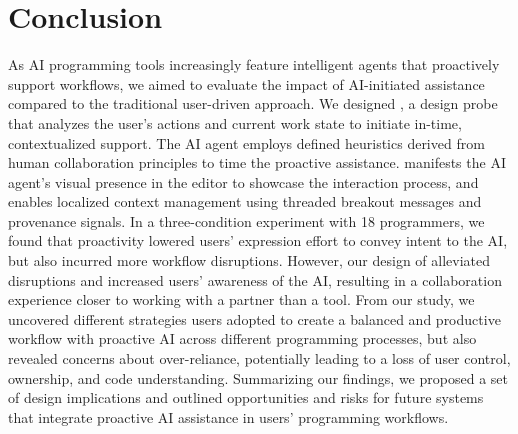 \section{Conclusion}
As AI programming tools increasingly feature intelligent agents that proactively support workflows, we aimed to evaluate the impact of AI-initiated assistance compared to the traditional user-driven approach.
We designed \sys{}, a design probe that analyzes the user's actions and current work state to initiate in-time, contextualized support. 
The AI agent employs defined heuristics derived from human collaboration principles to time the proactive assistance.
\sys{} manifests the AI agent's visual presence in the editor to showcase the interaction process, and enables localized context management using threaded breakout messages and provenance signals.
In a three-condition experiment with 18 programmers, we found that proactivity lowered users' expression effort to convey intent to the AI, but also incurred more workflow disruptions. 
However, our design of \sys{} alleviated disruptions and increased users' awareness of the AI, resulting in a collaboration experience closer to working with a partner than a tool.
From our study, we uncovered different strategies users adopted to create a balanced and productive workflow with proactive AI across different programming processes, but also revealed concerns about over-reliance, potentially leading to a loss of user control, ownership, and code understanding.
Summarizing our findings, we proposed a set of design implications and outlined opportunities and risks for future systems that integrate proactive AI assistance in users' programming workflows.
